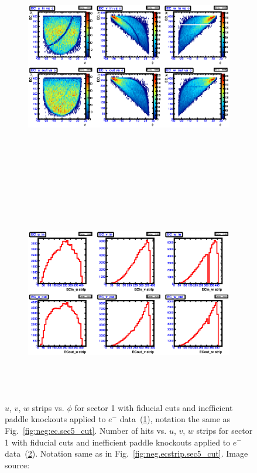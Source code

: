 \begin{figure}[htpb]
  \centering
  \begin{subfigure}[b]{\figwidth}
  \includegraphics[width=\figwidth, height=3.5in,valign=c]{figures/calib/ec/pim_ecuvw_phi_afterGeoFid_sec1.eps}\caption{}\label{fig:EC_III_I}
  \end{subfigure}%
  \\
  \begin{subfigure}[b]{\figwidth}
  \includegraphics[width=\figwidth, height=3.5in,valign=c]{figures/calib/ec/pim_ecuvw_afterGeoFid_sec1.eps}\caption{}\label{fig:EC_IV_I}
  \end{subfigure}%
      \caption { $u$, $v$, $w$ strips vs. $\phi$ for sector 1 with fiducial cuts and inefficient paddle knockouts applied to $e^-$ data~(\ref{fig:EC_III_I}), notation the same as Fig.~\ref{fig:neg:ec.sec5_cut}. Number of hits vs.  $u$, $v$, $w$ strips for sector 1 with fiducial cuts and inefficient paddle knockouts applied to $e^-$ data~(\ref{fig:EC_IV_I}). Notation same as in Fig.~\ref{fig:neg.ecstrip.sec5_cut}. Image source:~\cite{clas.thesis.kunkel}}
        \label{fig:EC_cut_I}
\end{figure}


